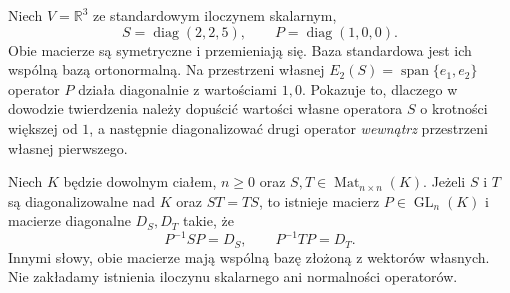\begin{przyklad}
\label{prz:lin14-commute}
Niech \(V=\mathbb R^3\)
ze standardowym iloczynem skalarnym,
\[
 S=\operatorname{diag}(2,2,5),
 \qquad
 P=\operatorname{diag}(1,0,0).
\]
Obie macierze są symetryczne
i przemieniają się.
Baza standardowa jest ich
wspólną bazą ortonormalną.
Na przestrzeni własnej
\(E_2(S)=\operatorname{span}\{e_1,e_2\}\)
operator \(P\) działa
diagonalnie z wartościami \(1,0\).
Pokazuje to, dlaczego w dowodzie
twierdzenia należy dopuścić
wartości własne operatora \(S\)
o krotności większej od \(1\),
a następnie diagonalizować
drugi operator \emph{wewnątrz}
przestrzeni własnej pierwszego.
\end{przyklad}

\begin{twierdzenie}
\label{thm:lin14-simultaneous-diagonalizable}
Niech \(K\) będzie dowolnym ciałem,
\(n\geq0\) oraz
\(S,T\in\operatorname{Mat}_{n\times n}(K)\).
Jeżeli \(S\) i \(T\) są diagonalizowalne nad \(K\)
oraz \(ST=TS\), to istnieje macierz
\(P\in\operatorname{GL}_n(K)\)
i macierze diagonalne \(D_S,D_T\) takie, że
\[
 P^{-1}SP=D_S,\qquad P^{-1}TP=D_T.
\]
Innymi słowy, obie macierze mają wspólną
bazę złożoną z wektorów własnych.
Nie zakładamy istnienia iloczynu skalarnego
ani normalności operatorów.
\end{twierdzenie}
